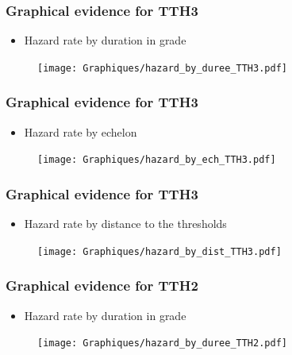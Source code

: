 \documentclass[xcolor=table,ignorenonframetext,12pt]{beamer}
\begin{document}
\begin{frame}
\frametitle{Graphical evidence for TTH3}
\begin{itemize}
	\item Hazard rate by duration in grade
\end{itemize}
\vspace{-0.2cm}
\begin{center}
\begin{figure}
\texttt{[image: Graphiques/hazard\_by\_duree\_TTH3.pdf]}
\end{figure}
\end{center}
\end{frame}

\begin{frame}
\frametitle{Graphical evidence for TTH3}
\begin{itemize}
	\item Hazard rate by echelon
\end{itemize}
\vspace{-0.2cm}
\begin{center}
\begin{figure}
\texttt{[image: Graphiques/hazard\_by\_ech\_TTH3.pdf]}
\end{figure}
\end{center}

\end{frame}
\begin{frame}
\frametitle{Graphical evidence for TTH3}
\begin{itemize}
	\item Hazard rate by distance to the thresholds
\end{itemize}
\vspace{-0.2cm}
\begin{center}
\begin{figure}
\texttt{[image: Graphiques/hazard\_by\_dist\_TTH3.pdf]}
\end{figure}
\end{center}

\end{frame}


\begin{frame}
\frametitle{Graphical evidence for TTH2}
\begin{itemize}
	\item Hazard rate by duration in grade
\end{itemize}
\vspace{-0.2cm}
\begin{center}
\begin{figure}
\texttt{[image: Graphiques/hazard\_by\_duree\_TTH2.pdf]}
\end{figure}
\end{center}
\end{frame}
\end{document}
